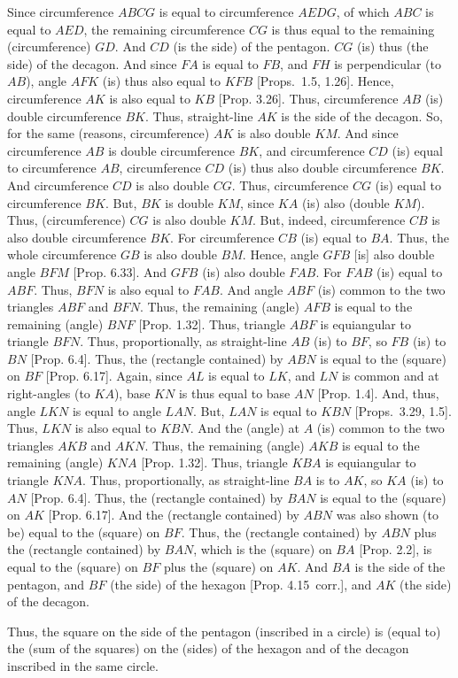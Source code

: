 \begin{Parallel}{}{}
{Since circumference $ABCG$ is equal to circumference $AEDG$,
of which $ABC$ is equal to $AED$, the remaining circumference
$CG$ is thus equal to the remaining (circumference) $GD$. And $CD$ (is the side) of the pentagon. 
$CG$ (is) thus (the side) of the decagon. And since  $FA$ is equal to $FB$,
and $FH$ is perpendicular (to $AB$), angle $AFK$ (is) thus also equal
to $KFB$ [Props.~1.5, 1.26]. Hence, circumference $AK$
is also equal to $KB$ [Prop. 3.26]. Thus, circumference $AB$ (is)
double circumference $BK$. Thus, straight-line $AK$ is the side of the decagon. 
So, for the same (reasons, circumference)  $AK$ is also double $KM$. And since
circumference $AB$ is double circumference $BK$, and
circumference $CD$ (is) equal to circumference $AB$, circumference
$CD$ (is) thus also double circumference $BK$. And
circumference $CD$ is also double $CG$. Thus, circumference
$CG$ (is) equal to circumference $BK$. But, $BK$
is double $KM$, since $KA$ (is) also (double $KM$). Thus,
(circumference) $CG$ is also double $KM$. But, indeed, circumference $CB$ is also
double circumference $BK$. For circumference $CB$ (is) equal to $BA$. 
Thus, the whole circumference $GB$ is also double $BM$. 
Hence, angle $GFB$ [is] also double  angle $BFM$ [Prop. 6.33].
And $GFB$ (is) also double $FAB$. For $FAB$ (is) equal to $ABF$. 
Thus, $BFN$ is also equal to $FAB$. And angle $ABF$ (is) common
to the two triangles $ABF$ and $BFN$. Thus, the
remaining (angle) $AFB$ is equal to the remaining (angle) $BNF$
[Prop. 1.32]. Thus, triangle $ABF$ is equiangular to triangle
$BFN$. Thus, proportionally, as straight-line $AB$ (is) to
$BF$, so $FB$ (is) to $BN$ [Prop. 6.4]. Thus, the (rectangle contained)
by $ABN$ is equal to the (square) on $BF$ [Prop. 6.17]. Again,
since $AL$ is equal to $LK$, and $LN$ is common and at right-angles (to $KA$), 
base $KN$ is thus equal to base $AN$  [Prop. 1.4]. And, thus, angle
$LKN$ is equal to angle $LAN$. But, $LAN$ is equal to
$KBN$ [Props.~3.29, 1.5]. Thus, $LKN$ is also equal to $KBN$. 
And the (angle) at $A$ (is) common to the two triangles $AKB$ and
$AKN$. Thus, the remaining (angle) $AKB$ is equal to the
remaining (angle) $KNA$ [Prop. 1.32]. Thus, triangle $KBA$ is
equiangular to triangle $KNA$. Thus, proportionally, as straight-line
$BA$ is to $AK$, so $KA$ (is) to $AN$ [Prop. 6.4]. Thus, the
(rectangle contained) by $BAN$ is equal to the (square) on $AK$ [Prop. 6.17]. 
And  the (rectangle contained) by $ABN$ was also shown (to be)
equal to the (square) on $BF$. Thus, the (rectangle contained) by $ABN$
plus the (rectangle contained) by $BAN$, which is the (square) on $BA$
[Prop. 2.2],
is equal to the (square) on $BF$ plus the (square) on $AK$. 
And $BA$ is the side of the pentagon, and $BF$ (the side) of the hexagon
[Prop. 4.15~corr.], and $AK$ (the side) of the decagon.

Thus, the square on the side of the pentagon  (inscribed in a circle) is (equal to) the (sum of the squares)
on the (sides) of the hexagon and of  the decagon inscribed in the
same circle.}
\end{Parallel}


